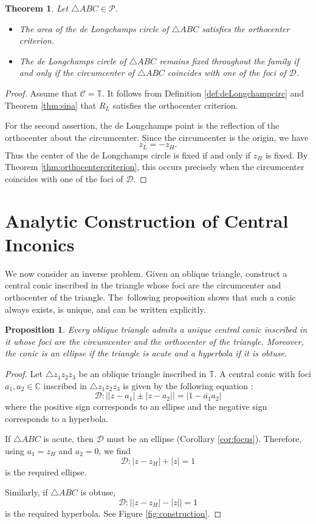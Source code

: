 \documentclass[11pt,reqno]{amsart}
\newtheorem{theorem}{Theorem}[section]
\newtheorem{proposition}{Proposition}[section]
\theoremstyle{definition}
\numberwithin{equation}{section}
\begin{document}
\begin{theorem}
Let $\triangle ABC \in \mathcal P$.
\begin{itemize}
\item[(a)]
The area of the de Longchamps circle of $\triangle ABC$ satisfies the orthocenter criterion.

\item[(b)]
The de Longchamps circle of $\triangle ABC$ remains fixed throughout the family if and only if the circumcenter of $\triangle ABC$ coincides with one of the foci of $\mathcal D$.
\end{itemize}
\end{theorem}
\begin{proof}
Assume that $\mathcal C=\mathbb T$. It follows from Definition \ref{def:deLongchampcirc} and Theorem \ref{thm:sina} that $R_L$ satisfies the orthocenter criterion.

For the second assertion, the de Longchamps point is the reflection of the orthocenter about the circumcenter. Since the circumcenter is the origin, we have
\[
z_L=-z_H.
\]
Thus the center of the de Longchamps circle is fixed if and only if $z_H$ is fixed. By Theorem \ref{thm:orthocentercriterion}, this occurs precisely when the circumcenter coincides with one of the foci of $\mathcal D$.
\end{proof}

\section{Analytic Construction of Central Inconics}
We now consider an inverse problem. Given an oblique triangle,  construct a central conic inscribed in the triangle whose foci are the circumcenter and orthocenter of the triangle. The \,following proposition shows that such a conic always exists, is unique, and can be written explicitly.

\begin{proposition}\label{prop:construction}
Every oblique triangle admits a unique central conic inscribed in it whose foci are the circumcenter and the orthocenter of the triangle. Moreover, the conic is an ellipse if the triangle is acute and a hyperbola if it is obtuse.
\end{proposition}

\begin{proof} Let $\triangle z_1z_2z_3$ be an oblique triangle inscribed in $\mathbb T$. A central conic with foci $a_1,a_2 \in \mathbb C$ inscribed in $\triangle z_1z_2z_3$ is given by the following equation \cite{Murad2026b}:
\[
\mathcal D:\left||z-a_1|\pm|z-a_2|\right|=|1-\overline{a_1}a_2|
\]
where the positive sign corresponds to an ellipse and the negative sign corresponds to a hyperbola.

If $\triangle ABC$ is acute, then $\mathcal D$ must be an ellipse (Corollary \ref{cor:focus}). Therefore, using $a_1=z_H$ and $a_2=0$, we find 
\[
\mathcal D:|z-z_H|+|z|=1
\]
is the required ellipse.

Similarly, if $\triangle ABC$ is obtuse,
\[
\mathcal D:\vert|z-z_H|-|z|\vert=1
\]
is the required hyperbola. See Figure \ref{fig:construction}.
\end{proof}
\end{document}
